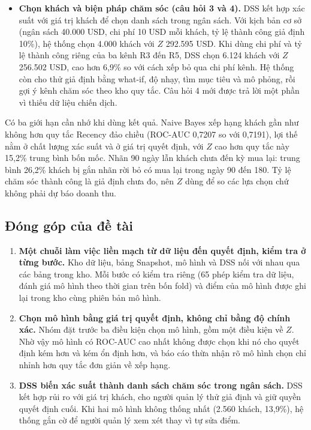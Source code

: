 \begin{itemize}
    \item \textbf{Chọn khách và biện pháp chăm sóc (câu hỏi 3 và 4).} DSS kết hợp xác suất với giá trị khách để chọn danh sách trong ngân sách. Với kịch bản cơ sở (ngân sách 40.000 USD, chi phí 10 USD mỗi khách, tỷ lệ thành công giả định 10\%), hệ thống chọn 4.000 khách với $Z$ 292.595 USD. Khi dùng chi phí và tỷ lệ thành công riêng của ba kênh R3 đến R5, DSS chọn 6.124 khách với $Z$ 256.502 USD, cao hơn 6,9\% so với cách xếp bỏ qua chi phí kênh. Hệ thống còn cho thử giả định bằng what-if, độ nhạy, tìm mục tiêu và mô phỏng, rồi gợi ý kênh chăm sóc theo kho quy tắc. Câu hỏi 4 mới được trả lời một phần vì thiếu dữ liệu chiến dịch.
\end{itemize}
Có ba giới hạn cần nhớ khi dùng kết quả. Naive Bayes xếp hạng khách gần như không hơn quy tắc Recency đảo chiều (ROC-AUC 0,7207 so với 0,7191), lợi thế nằm ở chất lượng xác suất và ở giá trị quyết định, với $Z$ cao hơn quy tắc này 15,2\% trung bình bốn mốc. Nhãn 90 ngày lẫn khách chưa đến kỳ mua lại: trung bình 26,2\% khách bị gắn nhãn rời bỏ có mua lại trong ngày 90 đến 180. Tỷ lệ chăm sóc thành công là giả định chưa đo, nên $Z$ dùng để so các lựa chọn chứ không phải dự báo doanh thu.

\subsection{Đóng góp của đề tài}
\begin{enumerate}
    \item \textbf{Một chuỗi làm việc liền mạch từ dữ liệu đến quyết định, kiểm tra ở từng bước.} Kho dữ liệu, bảng Snapshot, mô hình và DSS nối với nhau qua các bảng trong kho. Mỗi bước có kiểm tra riêng (65 phép kiểm tra dữ liệu, đánh giá mô hình theo thời gian trên bốn fold) và điểm của mô hình được ghi lại trong kho cùng phiên bản mô hình.
    \item \textbf{Chọn mô hình bằng giá trị quyết định, không chỉ bằng độ chính xác.} Nhóm đặt trước ba điều kiện chọn mô hình, gồm một điều kiện về $Z$. Nhờ vậy mô hình có ROC-AUC cao nhất không được chọn khi nó cho quyết định kém hơn và kém ổn định hơn, và báo cáo thừa nhận rõ mô hình chọn chỉ nhỉnh hơn quy tắc đơn giản về xếp hạng.
    \item \textbf{DSS biến xác suất thành danh sách chăm sóc trong ngân sách.} DSS kết hợp rủi ro với giá trị khách, cho người quản lý thử giả định và giữ quyền quyết định cuối. Khi hai mô hình không thống nhất (2.560 khách, 13,9\%), hệ thống gắn cờ để người quản lý xem xét thay vì tự sửa điểm.
\end{enumerate}


